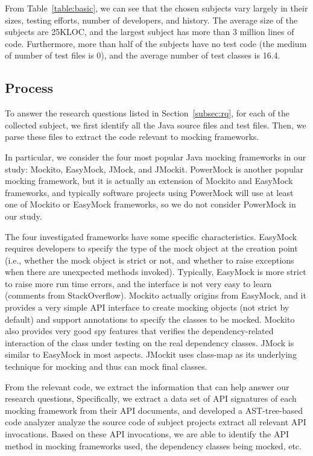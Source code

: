 From Table~\ref{table:basic}, we can see that the chosen subjects vary largely in their sizes, testing efforts, number of developers, and history. The average size of the subjects are 25KLOC, and the largest subject has more than 3 million lines of code. Furthermore, more than half of the subjects have no test code (the medium of number of test files is 0), and the average number of test classes is 16.4. 
\vspace{-0.2cm}

\subsection{Process}
\vspace{-0.2cm}

To answer the research questions listed in Section~\ref{subsec:rq}, for each of the collected subject, we first identify all the Java source files and test files. Then, we parse these files to extract the code relevant to mocking frameworks. 

In particular, we consider the four most popular Java mocking frameworks in our study: Mockito, EasyMock, JMock, and JMockit. PowerMock is another popular mocking framework, but it is actually an extension of Mockito and EasyMock frameworks, and typically software projects using PowerMock will use at least one of Mockito or EasyMock frameworks, so we do not consider PowerMock in our study. 

The four investigated frameworks have some specific characteristics. EasyMock
requires developers to specify the type of the mock object at the creation point (i.e., whether the mock object is strict or not, and whether to raise exceptions when there are unexpected methods invoked). Typically, EasyMock is more strict to raise more run time errors, and the interface is not very easy to learn (comments from StackOverflow). Mockito actually origins from EasyMock, and it
provides a very simple API interface to create mocking objects (not strict by default) and support annotations to specify the classes to be mocked. Mockito also provides very good spy features that verifies the dependency-related interaction of the class under testing on the real dependency classes. JMock is similar to EasyMock in most aspects. JMockit uses class-map as its underlying technique for mocking and thus can mock final classes. 


From the relevant code, we extract the information that can help answer our research questions, Specifically, we extract a data set of API signatures of each mocking framework from their API documents, and developed a AST-tree-based code analyzer analyze the source code of subject projects extract all relevant API invocations. Based on these API invocations, we are able to identify the API method in mocking frameworks used, the dependency classes being mocked, etc. 
